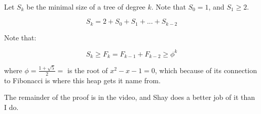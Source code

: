 \documentclass[a4paper]{article}
\begin{document}
\paragraph{}
Let $S_k$ be the minimal size of a tree of degree $k$. Note that $S_0=1$, and $S_1\ge2$.

\[S_k=2+S_0+S_1+...+S_{k-2}\]

Note that:

\[ S_k \ge F_k=F_{k-1}+F_{k-2} \ge \phi^k \]

where $\phi=\frac{1+\sqrt5}{2}=$ is the root of $x^2-x-1=0$, which because of its connection to Fibonacci is where this heap gets it name from.

The remainder of the proof is in the video, and Shay does a better job of it than I do.
\end{document}
